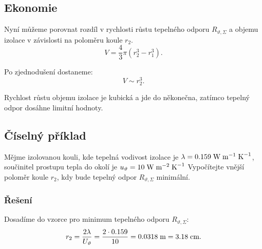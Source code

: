 \documentclass{article}
\begin{document}
\begin{center}
\end{center}


\subsection{Ekonomie}

Nyní můžeme porovnat rozdíl v rychlosti růstu tepelného odporu $R_{\vartheta,\Sigma}$ a objemu izolace v závislosti na poloměru koule $r_2$.
$$
    V = \frac{4}{3} \pi (r_2^3 - r_1^3).
$$

Po zjednodušení dostaneme:
$$
    V \sim r_2^3.
$$

Rychlost růstu objemu izolace je kubická a jde do někonečna, zatímco tepelný odpor dosáhne limitní hodnoty.


\subsection{Číselný příklad}
Mějme izolovanou kouli, kde tepelná vodivost izolace je $\lambda = 0.159 \; \textrm{W} \; \textrm{m}^{-1} \; \textrm{K}^{-1}$, součinitel prostupu tepla do okolí je $u_{\vartheta} = 10 \; \textrm{W} \; \textrm{m}^{-2} \; \textrm{K}^{-1}$ Vypočítejte vnější poloměr koule $r_2$, kdy bude tepelný odpor $R_{\vartheta,\Sigma}$ minimální.

\subsubsection{Řešení}
Dosadíme do vzorce pro minimum tepelného odporu $R_{\vartheta,\Sigma}$:
$$
    r_2 = \frac{2 \lambda}{U_{\vartheta}} = \frac{2 \cdot 0.159}{10} = 0.0318 \; \textrm{m} = 3.18 \; \textrm{cm}.
$$
\end{document}

